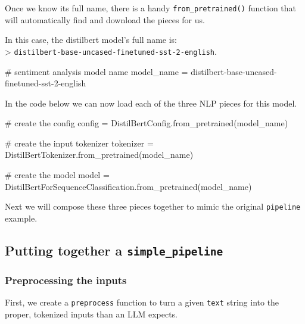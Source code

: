 \documentclass[
  letterpaper,
  DIV=11,
  numbers=noendperiod]{scrartcl}
\newenvironment{Shaded}{\begin{snugshade}}{\end{snugshade}}
\newcommand{\CommentTok}[1]{\textcolor[rgb]{0.37,0.37,0.37}{#1}}
\newcommand{\NormalTok}[1]{\textcolor[rgb]{0.00,0.23,0.31}{#1}}
\newcommand{\OperatorTok}[1]{\textcolor[rgb]{0.37,0.37,0.37}{#1}}
\newcommand{\StringTok}[1]{\textcolor[rgb]{0.13,0.47,0.30}{#1}}
\begin{document}
Once we know its full name, there is a handy \texttt{from\_pretrained()}
function that will automatically find and download the pieces for us.

In this case, the distilbert model's full name is:\\
\textgreater{} \texttt{distilbert-base-uncased-finetuned-sst-2-english}.

\begin{Shaded}
\begin{Highlighting}[]
\CommentTok{\# sentiment analysis model name}
\NormalTok{model\_name }\OperatorTok{=} \StringTok{\textquotesingle{}distilbert{-}base{-}uncased{-}finetuned{-}sst{-}2{-}english\textquotesingle{}}
\end{Highlighting}
\end{Shaded}

In the code below we can now load each of the three NLP pieces for this
model.

\begin{Shaded}
\begin{Highlighting}[]
\CommentTok{\# create the config}
\NormalTok{config }\OperatorTok{=}\NormalTok{ DistilBertConfig.from\_pretrained(model\_name)}

\CommentTok{\# create the input tokenizer }
\NormalTok{tokenizer }\OperatorTok{=}\NormalTok{ DistilBertTokenizer.from\_pretrained(model\_name)}

\CommentTok{\# create the model}
\NormalTok{model }\OperatorTok{=}\NormalTok{ DistilBertForSequenceClassification.from\_pretrained(model\_name)}
\end{Highlighting}
\end{Shaded}

Next we will compose these three pieces together to mimic the original
\texttt{pipeline} example.

\subsection{\texorpdfstring{Putting together a
\texttt{simple\_pipeline}}{Putting together a simple\_pipeline}}\label{putting-together-a-simple_pipeline}

\subsubsection{Preprocessing the inputs}\label{preprocessing-the-inputs}

First, we create a \texttt{preprocess} function to turn a given
\texttt{text} string into the proper, tokenized inputs than an LLM
expects.
\end{document}
